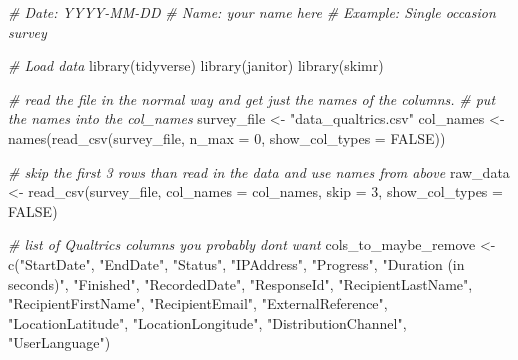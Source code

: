 \documentclass[
]{krantz}
\makeatletter
\newenvironment{Shaded}{\begin{snugshade}}{\end{snugshade}}
\newcommand{\AttributeTok}[1]{\textcolor[rgb]{0.61,0.61,0.61}{#1}}
\newcommand{\CommentTok}[1]{\textcolor[rgb]{0.37,0.37,0.37}{\textit{#1}}}
\newcommand{\ConstantTok}[1]{\textcolor[rgb]{0,0,0}{#1}}
\newcommand{\DecValTok}[1]{\textcolor[rgb]{0.06,0.06,0.06}{#1}}
\newcommand{\FunctionTok}[1]{\textcolor[rgb]{0,0,0}{#1}}
\newcommand{\NormalTok}[1]{#1}
\newcommand{\OtherTok}[1]{\textcolor[rgb]{0.37,0.37,0.37}{#1}}
\newcommand{\StringTok}[1]{\textcolor[rgb]{0.5,0.5,0.5}{#1}}
\newenvironment{kframe}{%
\medskip{}
\setlength{\fboxsep}{.8em}
 \def\at@end@of@kframe{}%
 \ifinner\ifhmode%
  \def\at@end@of@kframe{\end{minipage}}%
  \begin{minipage}{\columnwidth}%
 \fi\fi%
 \def\FrameCommand##1{\hskip\@totalleftmargin \hskip-\fboxsep
 \colorbox{shadecolor}{##1}\hskip-\fboxsep
     \hskip-\linewidth \hskip-\@totalleftmargin \hskip\columnwidth}%
 \MakeFramed {\advance\hsize-\width
   \@totalleftmargin\z@ \linewidth\hsize
   \@setminipage}}%
 {\par\unskip\endMakeFramed%
 \at@end@of@kframe}
\renewenvironment{Shaded}{\begin{kframe}}{\end{kframe}}
\makeatother
\begin{document}
\begin{Shaded}
\begin{Highlighting}[]
\CommentTok{\# Date: YYYY{-}MM{-}DD}
\CommentTok{\# Name: your name here}
\CommentTok{\# Example: Single occasion survey}

\CommentTok{\# Load data}
\FunctionTok{library}\NormalTok{(tidyverse)}
\FunctionTok{library}\NormalTok{(janitor)}
\FunctionTok{library}\NormalTok{(skimr)}

\CommentTok{\# read the file in the normal way and get just the names of the columns.}
\CommentTok{\# put the names into the col\_names}
\NormalTok{survey\_file }\OtherTok{\textless{}{-}} \StringTok{"data\_qualtrics.csv"}
\NormalTok{col\_names }\OtherTok{\textless{}{-}} \FunctionTok{names}\NormalTok{(}\FunctionTok{read\_csv}\NormalTok{(survey\_file,}
                            \AttributeTok{n\_max =} \DecValTok{0}\NormalTok{,}
                            \AttributeTok{show\_col\_types =} \ConstantTok{FALSE}\NormalTok{))}

\CommentTok{\# skip the first 3 rows than read in the data and use names from above}
\NormalTok{raw\_data }\OtherTok{\textless{}{-}} \FunctionTok{read\_csv}\NormalTok{(survey\_file,}
                     \AttributeTok{col\_names =}\NormalTok{ col\_names, }
                     \AttributeTok{skip =} \DecValTok{3}\NormalTok{,}
                     \AttributeTok{show\_col\_types =} \ConstantTok{FALSE}\NormalTok{)}

\CommentTok{\# list of Qualtrics columns you probably don\textquotesingle{}t want}
\NormalTok{cols\_to\_maybe\_remove }\OtherTok{\textless{}{-}} \FunctionTok{c}\NormalTok{(}\StringTok{"StartDate"}\NormalTok{,}
                          \StringTok{"EndDate"}\NormalTok{,}
                          \StringTok{"Status"}\NormalTok{,}
                          \StringTok{"IPAddress"}\NormalTok{,}
                          \StringTok{"Progress"}\NormalTok{,}
                          \StringTok{"Duration (in seconds)"}\NormalTok{,}
                          \StringTok{"Finished"}\NormalTok{,}
                          \StringTok{"RecordedDate"}\NormalTok{,}
                          \StringTok{"ResponseId"}\NormalTok{,}
                          \StringTok{"RecipientLastName"}\NormalTok{,}
                          \StringTok{"RecipientFirstName"}\NormalTok{,}
                          \StringTok{"RecipientEmail"}\NormalTok{,}
                          \StringTok{"ExternalReference"}\NormalTok{,}
                          \StringTok{"LocationLatitude"}\NormalTok{,}
                          \StringTok{"LocationLongitude"}\NormalTok{,}
                          \StringTok{"DistributionChannel"}\NormalTok{,}
                          \StringTok{"UserLanguage"}\NormalTok{)}


\end{Highlighting}
\end{Shaded}
\end{document}
